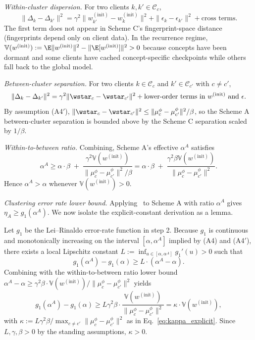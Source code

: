 \emph{Within-cluster dispersion.} For two clients $k, k' \in \mathcal{C}_c$,
\[
\|\Delta_k - \Delta_{k'}\|^2 = \gamma^2 \| w_{k'}^{(\mathrm{init})} - w_k^{(\mathrm{init})} \|^2 + \|\epsilon_k - \epsilon_{k'}\|^2 + \text{cross terms}.
\]
The first term does not appear in Scheme C's fingerprint-space distance (fingerprints depend only on client data). In the recurrence regime, $\mathbb{V}(w^{(\mathrm{init})}) := \E \|w^{(\mathrm{init})}\|^2 - \|\E[w^{(\mathrm{init})}]\|^2 > 0$ because concepts have been dormant and some clients have cached concept-specific checkpoints while others fall back to the global model.

\emph{Between-cluster separation.} For two clients $k \in \mathcal{C}_c$ and $k' \in \mathcal{C}_{c'}$ with $c \ne c'$,
\[
\|\Delta_k - \Delta_{k'}\|^2 = \gamma^2 \|\wstar_c - \wstar_{c'}\|^2 + \text{lower-order terms in } w^{(\mathrm{init})} \text{ and } \epsilon.
\]
By assumption (A4$'$), $\|\wstar_c - \wstar_{c'}\|^2 \le \|\mu_c^\phi - \mu_{c'}^\phi\|^2 / \beta$, so the Scheme A between-cluster separation is bounded above by the Scheme C separation scaled by $1/\beta$.

\emph{Within-to-between ratio.} Combining, Scheme A's effective $\alpha^A$ satisfies
\[
\alpha^A \ge \alpha \cdot \beta \;+\; \frac{\gamma^2 \mathbb{V}(w^{(\mathrm{init})})}{\|\mu_c^\phi - \mu_{c'}^\phi\|^2/\beta}
= \alpha \cdot \beta \;+\; \frac{\gamma^2 \beta \mathbb{V}(w^{(\mathrm{init})})}{\|\mu_c^\phi - \mu_{c'}^\phi\|^2}.
\]
Hence $\alpha^A > \alpha$ whenever $\mathbb{V}(w^{(\mathrm{init})}) > 0$.

\emph{Clustering error rate lower bound.} Applying~\citet{lei2015consistency} to Scheme A with ratio $\alpha^A$ gives $\eta_A \ge g_1(\alpha^A)$. We now isolate the explicit-constant derivation as a lemma.

\begin{lemma}
\label{lem:kappa}
Let $g_1$ be the Lei--Rinaldo error-rate function in step 2. Because $g_1$ is continuous and monotonically increasing on the interval $[\alpha, \alpha^A]$ implied by (A4) and (A4$'$), there exists a local Lipschitz constant $L := \inf_{u \in [\alpha, \alpha^A]} g_1'(u) > 0$ such that
\[
g_1(\alpha^A) - g_1(\alpha) \ge L \cdot (\alpha^A - \alpha).
\]
Combining with the within-to-between ratio lower bound $\alpha^A - \alpha \ge \gamma^2 \beta \cdot \mathbb{V}(w^{(\mathrm{init})}) / \|\mu_c^\phi - \mu_{c'}^\phi\|^2$ yields
\[
g_1(\alpha^A) - g_1(\alpha) \ge L \gamma^2 \beta \cdot \frac{\mathbb{V}(w^{(\mathrm{init})})}{\|\mu_c^\phi - \mu_{c'}^\phi\|^2}
= \kappa \cdot \mathbb{V}(w^{(\mathrm{init})}),
\]
with $\kappa := L \gamma^2 \beta / \max_{c \ne c'} \|\mu_c^\phi - \mu_{c'}^\phi\|^2$ as in Eq.~\eqref{eq:kappa_explicit}. Since $L, \gamma, \beta > 0$ by the standing assumptions, $\kappa > 0$.
\end{lemma}

